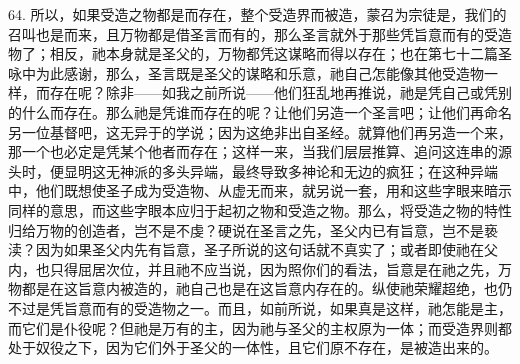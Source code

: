 64. 所以，如果受造之物都是而存在，整个受造界而被造，蒙召为宗徒是，我们的召叫也是而来，且万物都是借圣言而有的，那么圣言就外于那些凭旨意而有的受造物了；相反，祂本身就是圣父的，万物都凭这谋略而得以存在；也在第七十二篇圣咏中为此感谢，那么，圣言既是圣父的谋略和乐意，祂自己怎能像其他受造物一样，而存在呢？除非——如我之前所说——他们狂乱地再推说，祂是凭自己或凭别的什么而存在。那么祂是凭谁而存在的呢？让他们另造一个圣言吧；让他们再命名另一位基督吧，这无异于的学说；因为这绝非出自圣经。就算他们再另造一个来，那一个也必定是凭某个他者而存在；这样一来，当我们层层推算、追问这连串的源头时，便显明这无神派的多头异端，最终导致多神论和无边的疯狂；在这种异端中，他们既想使圣子成为受造物、从虚无而来，就另说一套，用和这些字眼来暗示同样的意思，而这些字眼本应归于起初之物和受造之物。那么，将受造之物的特性归给万物的创造者，岂不是不虔？硬说在圣言之先，圣父内已有旨意，岂不是亵渎？因为如果圣父内先有旨意，圣子所说的这句话就不真实了；或者即使祂在父内，也只得屈居次位，并且祂不应当说，因为照你们的看法，旨意是在祂之先，万物都是在这旨意内被造的，祂自己也是在这旨意内存在的。纵使祂荣耀超绝，也仍不过是凭旨意而有的受造物之一。而且，如前所说，如果真是这样，祂怎能是主，而它们是仆役呢？但祂是万有的主，因为祂与圣父的主权原为一体；而受造界则都处于奴役之下，因为它们外于圣父的一体性，且它们原不存在，是被造出来的。\par

